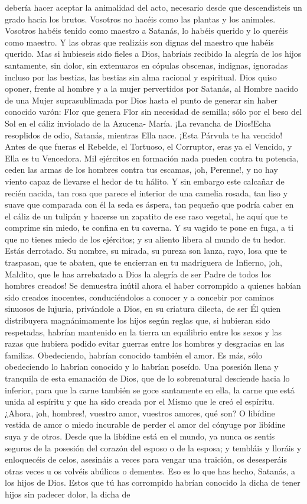 \documentclass[12pt, twoside, openright]{book} %
\begin{document}
debería hacer aceptar la animalidad del acto, necesario desde que descendisteis un grado hacia los brutos. Vosotros no hacéis como las plantas y los animales. Vosotros habéis tenido como maestro a Satanás, lo habéis querido y lo queréis como maestro. Y las obras que realizáis son dignas del maestro que habéis querido. Mas si hubieseis sido fieles a Dios, habríais recibido la alegría de los hijos santamente, sin dolor, sin extenuaros en cópulas obscenas, indignas, ignoradas incluso por las bestias, las bestias sin alma racional y espiritual. Dios quiso oponer, frente al hombre y a la mujer pervertidos por Satanás, al Hombre nacido de una Mujer suprasublimada por Dios hasta el punto de generar sin haber conocido varón: Flor que genera Flor sin necesidad de semilla; sólo por el beso del Sol en el cáliz inviolado de la Azucena- María. ¡La revancha de Dios!Echa resoplidos de odio, Satanás, mientras Ella nace. ¡Esta Párvula te ha vencido! Antes de que fueras el Rebelde, el Tortuoso, el Corruptor, eras ya el Vencido, y Ella es tu Vencedora. Mil ejércitos en formación nada pueden contra tu potencia, ceden las armas de los hombres contra tus escamas, ¡oh, Perenne!, y no hay viento capaz de llevarse el hedor de tu hálito. Y sin embargo este calcañar de recién nacida, tan rosa que parece el interior de una camelia rosada, tan liso y suave que comparada con él la seda es áspera, tan pequeño que podría caber en el cáliz de un tulipán y hacerse un zapatito de ese raso vegetal, he aquí que te comprime sin miedo, te confina en tu caverna. Y su vagido te pone en fuga, a ti que no tienes miedo de los ejércitos; y su aliento libera al mundo de tu hedor. Estás derrotado. Su nombre, su mirada, su pureza son lanza, rayo, losa que te traspasan, que te abaten, que te encierran en tu madriguera de Infierno, ¡oh, Maldito, que le has arrebatado a Dios la alegría de ser Padre de todos los hombres creados! Se demuestra inútil ahora el haber corrompido a quienes habían sido creados inocentes, conduciéndolos a conocer y a concebir por caminos sinuosos de lujuria, privándole a Dios, en su criatura dilecta, de ser Él quien distribuyera magnánimamente los hijos según reglas que, si hubieran sido respetadas, habrían mantenido en la tierra un equilibrio entre los sexos y las razas que hubiera podido evitar guerras entre los hombres y desgracias en las familias. Obedeciendo, habrían conocido también el amor. Es más, sólo obedeciendo lo habrían conocido y lo habrían poseído. Una posesión llena y tranquila de esta emanación de Dios, que de lo sobrenatural desciende hacia lo inferior, para que la carne también se goce santamente en ella, la carne que está unida al espíritu y que ha sido creada por el Mismo que le creó el espíritu. ¿Ahora, ¡oh, hombres!, vuestro amor, vuestros amores, qué son? O libídine vestida de amor o miedo incurable de perder el amor del cónyuge por libídine suya y de otros. Desde que la libídine está en el mundo, ya nunca os sentís seguros de la posesión del corazón del esposo o de la esposa; y tembláis y lloráis y enloquecéis de celos, asesináis a veces para vengar una traición, os desesperáis otras veces u os volvéis abúlicos o dementes. Eso es lo que has hecho, Satanás, a los hijos de Dios. Estos que tú has corrompido habrían conocido la dicha de tener hijos sin padecer dolor, la dicha de 
\end{document}
